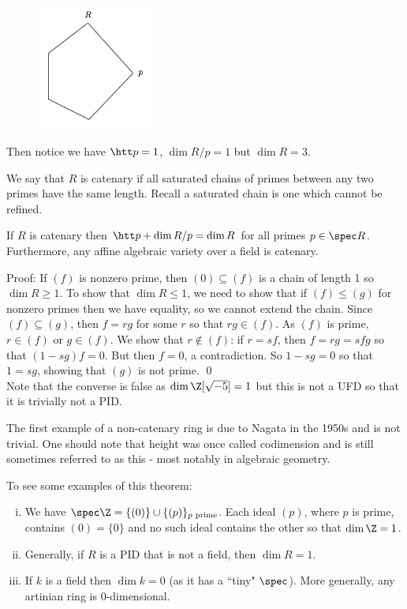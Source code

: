 \begin{figure}[H]
   \centering
   \includegraphics[width=1.5in]{diag.png} 
\end{figure}

Then notice we have $\htt p=1$, $\dim R/p=1$ but $\dim R=3$. 

\begin{dfn}[Catenary]
We say that $R$ is catenary if all saturated chains of primes between any two primes have the same length. Recall a saturated chain is one which cannot be refined. 
\end{dfn}

\begin{thmm}[Ratliff]
If $R$ is catenary then $\htt p+\dim R/p=\dim R$ for all primes $p \in \spec R$. Furthermore, any affine algebraic variety over a field is catenary. 
\end{thmm}

\noindent Proof: If $(f)$ is nonzero prime, then $(0) \subseteq (f)$ is a chain of length 1 so $\dim R \geq 1$. To show that $\dim R \leq 1$, we need to show that if $(f) \leq (g)$ for nonzero primes then we have equality, so we cannot extend the chain. Since $(f) \subseteq (g)$, then $f=rg$ for some $r$ so that $rg \in (f)$. As $(f)$ is prime, $r \in (f)$ or $g \in (f)$. We show that $r \notin (f)$: if $r=sf$, then $f=rg=sfg$ so that $(1-sg)f=0$. But then $f=0$, a contradiction. So $1-sg=0$ so that $1=sg$, showing that $(g)$ is not prime. \qed \\

Note that the converse is false as $\dim \Z[\sqrt{-5}]=1$ but this is not a UFD so that it is trivially not a PID. 

The first example of a non-catenary ring is due to Nagata in the 1950s and is not trivial. One should note that height was once called codimension and is still sometimes referred to as this - most notably in algebraic geometry. 

\begin{ex} To see some examples of this theorem:
\begin{enumerate}[(i)]
\item We have $\spec \Z=\{(0)\} \cup \{(p)\}_{p \text{ prime}}$. Each ideal $(p)$, where $p$ is prime, contains $(0)=\{0\}$ and no such ideal contains the other so that $\dim \Z=1$.

\item Generally, if $R$ is a PID that is not a field, then $\dim R=1$. 

\item If $k$ is a field then $\dim k=0$ (as it has a ``tiny" $\spec$). More generally, any artinian ring is 0-dimensional. 
\end{enumerate}
\end{ex}


